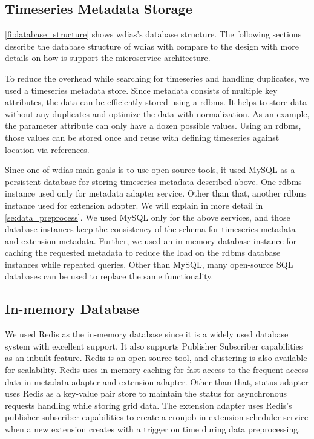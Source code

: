 \subsection{Timeseries Metadata Storage}
\label{subse:mysql}

\cref{fi:database_structure} shows \acrshort{wdias}'s database structure.
The following sections describe the database structure of \acrshort{wdias} with compare to the design with more details on how is support the microservice architecture.

To reduce the overhead while searching for timeseries and handling duplicates, we used a timeseries metadata store. Since metadata consists of multiple key attributes, the data can be efficiently stored using a \acrfull{rdbms}. It helps to store data without any duplicates and optimize the data with normalization. As an example, the parameter attribute can only have a dozen possible values. Using an \acrshort{rdbms}, those values can be stored once and reuse with defining timeseries against location via references.

Since one of \acrshort{wdias} main goals is to use open source tools, it used MySQL as a persistent database for storing timeseries metadata described above. One \acrshort{rdbms} instance used only for metadata adapter service. Other than that, another \acrshort{rdbms} instance used for extension adapter. We will explain in more detail in \cref{se:data_preprocess}. We used MySQL only for the above services, and those database instances keep the consistency of the schema for timeseries metadata and extension metadata. Further, we used an in-memory database instance for caching the requested metadata to reduce the load on the \acrshort{rdbms} database instances while repeated queries. Other than MySQL, many open-source SQL databases can be used to replace the same functionality.

\subsection{In-memory Database}
\label{subse:redis}

We used Redis \cite{RedisRedisDocumentation} as the in-memory database since it is a widely used database system with excellent support. It also supports Publisher Subscriber capabilities as an inbuilt feature. Redis is an open-source tool, and clustering is also available for scalability. Redis uses in-memory caching for fast access to the frequent access data in metadata adapter and extension adapter. Other than that, status adapter uses Redis as a key-value pair store to maintain the status for asynchronous requests handling while storing grid data. The extension adapter uses Redis's publisher subscriber capabilities to create a cronjob in extension scheduler service when a new extension creates with a trigger on time during data preprocessing.

